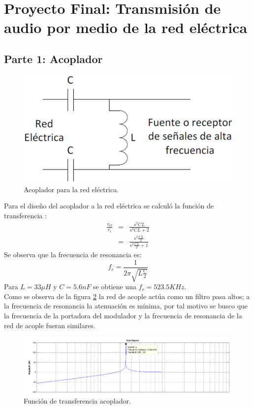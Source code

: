 \documentclass[11pt,graphicx,caption,rotating]{article}
\begin{document}
\section{Proyecto Final: Transmisión de audio por medio de la red eléctrica}
\subsection{Parte 1: Acoplador}
\begin{figure}[H]
	\centering
		\includegraphics[scale=0.35]{acoplador.png}
	\caption{Acoplador para la red eléctrica.}
	\label{fig18}
\end{figure}
\noindent
Para el diseño del acoplador a la red eléctrica se calculó la función de transferencia :
\begin{eqnarray}
 \frac{v_O}{v_i} & = & \frac{s^{2}CL}{s^2CL +2} \label{ecu19}\\
 & = & \frac{s^{2}\frac{CL}{2}}{s^2 \frac{CL}{2} +1} \label{ecu20}
\end{eqnarray}
\noindent
Se observa que la frecuencia de resonancia es:
\begin{equation}
 f_{r} = \frac{1}{2 \pi \sqrt{L\frac{C}{2}}}
\end{equation}
\noindent
Para $L= 33 \mu H$ y $C= 5.6 nF$ se obtiene una $f_r = 523.5 KHz$.\\
Como se observa de la figura \ref{fig19} la red de acople actúa como un filtro pasa altos; a la frecuencia de resonancia  la atenuación es mínima, por tal motivo se busco que la frecuencia de la portadora del modulador y la frecuencia de resonancia de la red de acople fueran similares.
\begin{figure}[H]
	\centering
		\includegraphics[scale=0.5]{bode.png}
	\caption{Función de transferencia acoplador.}
	\label{fig19}
\end{figure}
\end{document}
